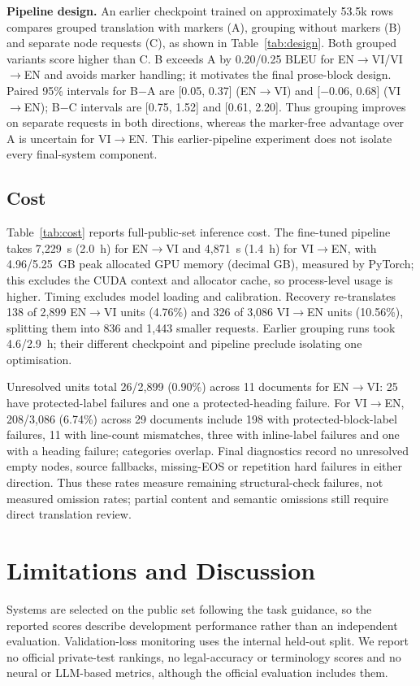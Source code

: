 \documentclass[11pt]{article}
\newcommand{\envi}{EN$\rightarrow$VI}
\newcommand{\vien}{VI$\rightarrow$EN}
\begin{document}
\textbf{Pipeline design.} An earlier checkpoint trained on approximately 53.5k rows compares grouped translation with markers (A), grouping without markers (B) and separate node requests (C), as shown in Table~\ref{tab:design}. Both grouped variants score higher than C. B exceeds A by 0.20/0.25 BLEU for \envi{}/\vien{} and avoids marker handling; it motivates the final prose-block design. Paired 95\% intervals for B$-$A are [0.05, 0.37] (\envi{}) and [$-$0.06, 0.68] (\vien{}); B$-$C intervals are [0.75, 1.52] and [0.61, 2.20]. Thus grouping improves on separate requests in both directions, whereas the marker-free advantage over A is uncertain for \vien{}. This earlier-pipeline experiment does not isolate every final-system component.

\subsection{Cost}
Table~\ref{tab:cost} reports full-public-set inference cost. The fine-tuned pipeline takes 7,229~s (2.0~h) for \envi{} and 4,871~s (1.4~h) for \vien{}, with 4.96/5.25~GB peak allocated GPU memory (decimal GB), measured by PyTorch; this excludes the CUDA context and allocator cache, so process-level usage is higher. Timing excludes model loading and calibration. Recovery re-translates 138 of 2,899 \envi{} units (4.76\%) and 326 of 3,086 \vien{} units (10.56\%), splitting them into 836 and 1,443 smaller requests. Earlier grouping runs took 4.6/2.9~h; their different checkpoint and pipeline preclude isolating one optimisation.

Unresolved units total 26/2,899 (0.90\%) across 11 documents for \envi{}: 25 have protected-label failures and one a protected-heading failure. For \vien{}, 208/3,086 (6.74\%) across 29 documents include 198 with protected-block-label failures, 11 with line-count mismatches, three with inline-label failures and one with a heading failure; categories overlap. Final diagnostics record no unresolved empty nodes, source fallbacks, missing-EOS or repetition hard failures in either direction. Thus these rates measure remaining structural-check failures, not measured omission rates; partial content and semantic omissions still require direct translation review.

\section{Limitations and Discussion}\label{sec:limitations}
Systems are selected on the public set following the task guidance, so the reported scores describe development performance rather than an independent evaluation. Validation-loss monitoring uses the internal held-out split. We report no official private-test rankings, no legal-accuracy or terminology scores and no neural or LLM-based metrics, although the official evaluation includes them.
\end{document}
